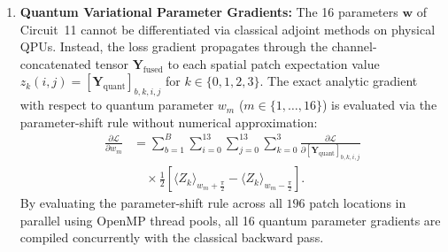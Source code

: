 \documentclass[pdflatex,sn-mathphys-num]{sn-jnl}%
\theoremstyle{thmstyleone}%
\theoremstyle{thmstyletwo}%
\theoremstyle{thmstylethree}%
\begin{document}
\begin{enumerate}
\begin{align}
    &\quad \times \sigma'\left([\mathbf{Z}_{\mathrm{class}}]_{b, c_{\mathrm{out}}, i, j}\right) \nonumber \\
    &\quad \times \tilde{\mathbf{X}}_{b, 0}(2i + u - 1, \, 2j + v - 1),
    \label{eq:conv_kernel_gradient_explicit}
    \end{align}
    where $\tilde{\mathbf{X}}$ is the zero-padded input image, and the additive bias gradient is:
    \begin{equation}
    \frac{\partial \mathcal{L}}{\partial [\mathbf{b}_{\mathrm{c}}]_{c_{\mathrm{out}}}} = \sum_{b=1}^B \sum_{i=0}^{13} \sum_{j=0}^{13} \frac{\partial \mathcal{L}}{\partial [\mathbf{Y}_{\mathrm{class}}]_{b, c_{\mathrm{out}}, i, j}} \cdot \sigma'\left([\mathbf{Z}_{\mathrm{class}}]_{b, c_{\mathrm{out}}, i, j}\right).
    \label{eq:conv_bias_gradient_explicit}
    \end{equation}
    These classical gradient tensor operations execute on GPU via highly optimized CUDA kernels in ${<}2.5\,\mathrm{ms}$ per batch.

    \item \textbf{Quantum Variational Parameter Gradients:} The 16 parameters $\mathbf{w}$ of Circuit~11 cannot be differentiated via classical adjoint methods on physical QPUs. Instead, the loss gradient propagates through the channel-concatenated tensor $\mathbf{Y}_{\mathrm{fused}}$ to each spatial patch expectation value $z_k(i, j) = [\mathbf{Y}_{\mathrm{quant}}]_{b, k, i, j}$ for $k \in \{0, 1, 2, 3\}$. The exact analytic gradient with respect to quantum parameter $w_m$ ($m \in \{1, \dots, 16\}$) is evaluated via the parameter-shift rule without numerical approximation:
    \begin{align}
    \frac{\partial \mathcal{L}}{\partial w_m} &= \sum_{b=1}^B \sum_{i=0}^{13} \sum_{j=0}^{13} \sum_{k=0}^3 \frac{\partial \mathcal{L}}{\partial [\mathbf{Y}_{\mathrm{quant}}]_{b,k,i,j}} \nonumber \\
    &\quad \times \frac{1}{2}\left[ \langle Z_k \rangle_{w_m + \frac{\pi}{2}} - \langle Z_k \rangle_{w_m - \frac{\pi}{2}} \right].
    \label{eq:hybrid_parameter_shift_backprop}
    \end{align}
    By evaluating the parameter-shift rule across all $196$ patch locations in parallel using OpenMP thread pools, all 16 quantum parameter gradients are compiled concurrently with the classical backward pass.


\end{enumerate}
\end{document}
